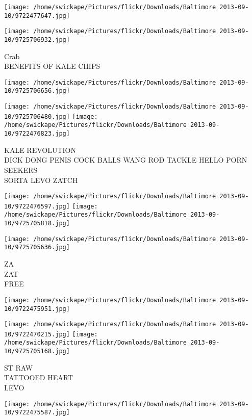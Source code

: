 \documentclass[10pt,letterpaper]{article}
\begin{document}
\texttt{[image: /home/swickape/Pictures/flickr/Downloads/Baltimore 2013-09-10/9722477647.jpg]}

\vspace{0.25in}
\texttt{[image: /home/swickape/Pictures/flickr/Downloads/Baltimore 2013-09-10/9725706932.jpg]}

Crab\\
BENEFITS OF KALE CHIPS\\
\pagebreak

\texttt{[image: /home/swickape/Pictures/flickr/Downloads/Baltimore 2013-09-10/9725706656.jpg]}

\vspace{0.25in}
\texttt{[image: /home/swickape/Pictures/flickr/Downloads/Baltimore 2013-09-10/9725706480.jpg]}
\texttt{[image: /home/swickape/Pictures/flickr/Downloads/Baltimore 2013-09-10/9722476823.jpg]}

KALE REVOLUTION\\
DICK DONG PENIS COCK BALLS WANG ROD TACKLE HELLO PORN SEEKERS\\
SORTA LEVO ZATCH\\
\pagebreak

\texttt{[image: /home/swickape/Pictures/flickr/Downloads/Baltimore 2013-09-10/9722476597.jpg]}
\texttt{[image: /home/swickape/Pictures/flickr/Downloads/Baltimore 2013-09-10/9725705818.jpg]}

\texttt{[image: /home/swickape/Pictures/flickr/Downloads/Baltimore 2013-09-10/9725705636.jpg]}

ZA\\
ZAT\\
FREE\\
\pagebreak

\texttt{[image: /home/swickape/Pictures/flickr/Downloads/Baltimore 2013-09-10/9722475951.jpg]}

\vspace{0.25in}
\texttt{[image: /home/swickape/Pictures/flickr/Downloads/Baltimore 2013-09-10/9722470215.jpg]}
\texttt{[image: /home/swickape/Pictures/flickr/Downloads/Baltimore 2013-09-10/9725705168.jpg]}

ST RAW\\
TATTOOED HEART\\
LEVO\\
\pagebreak

\texttt{[image: /home/swickape/Pictures/flickr/Downloads/Baltimore 2013-09-10/9722475587.jpg]}
\end{document}
